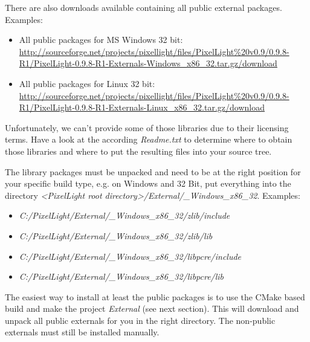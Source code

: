 There are also downloads available containing all public external packages. Examples:
\begin{itemize}
\item{All public packages for MS Windows 32 bit: \url{http://sourceforge.net/projects/pixellight/files/PixelLight%20v0.9/0.9.8-R1/PixelLight-0.9.8-R1-Externals-Windows_x86_32.tar.gz/download}}
\item{All public packages for Linux 32 bit: \url{http://sourceforge.net/projects/pixellight/files/PixelLight%20v0.9/0.9.8-R1/PixelLight-0.9.8-R1-Externals-Linux_x86_32.tar.gz/download}}
\end{itemize}

Unfortunately, we can't provide some of those libraries due to their licensing terms. Have a look at the according \emph{Readme.txt} to determine where to obtain those libraries and where to put the resulting files into your source tree.

The library packages must be unpacked and need to be at the right position for your specific build type, e.g. on Windows and 32 Bit, put everything into the directory \emph{\textless PixelLight root directory\textgreater /External/\_Windows\_x86\_32}. Examples:
\begin{itemize}
\item{\emph{C:/PixelLight/External/\_Windows\_x86\_32/zlib/include}}
\item{\emph{C:/PixelLight/External/\_Windows\_x86\_32/zlib/lib}}
\item{\emph{C:/PixelLight/External/\_Windows\_x86\_32/libpcre/include}}
\item{\emph{C:/PixelLight/External/\_Windows\_x86\_32/libpcre/lib}}
\end{itemize}

The easiest way to install at least the public packages is to use the CMake based build and make the project \emph{External} (see next section). This will download and unpack all public externals for you in the right directory. The non-public externals must still be installed manually.
